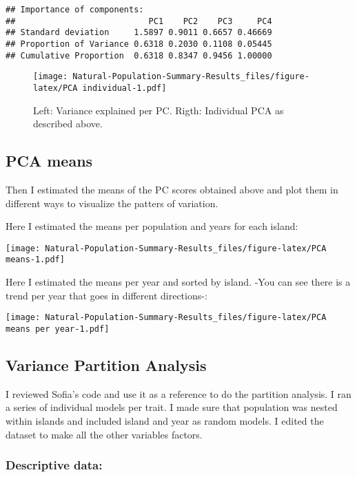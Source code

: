 \documentclass[
]{article}
\begin{document}
\begin{verbatim}
## Importance of components:
##                           PC1    PC2    PC3     PC4
## Standard deviation     1.5897 0.9011 0.6657 0.46669
## Proportion of Variance 0.6318 0.2030 0.1108 0.05445
## Cumulative Proportion  0.6318 0.8347 0.9456 1.00000
\end{verbatim}

\begin{figure}
\centering
\texttt{[image: Natural-Population-Summary-Results\_files/figure-latex/PCA individual-1.pdf]}
\caption{Left: Variance explained per PC. Rigth: Individual PCA as
described above.}
\end{figure}

\hypertarget{pca-means}{%
\subsection{PCA means}\label{pca-means}}

Then I estimated the means of the PC scores obtained above and plot them
in different ways to visualize the patters of variation.

Here I estimated the means per population and years for each island:

\texttt{[image: Natural-Population-Summary-Results\_files/figure-latex/PCA means-1.pdf]}

Here I estimated the means per year and sorted by island. -You can see
there is a trend per year that goes in different directions-:

\texttt{[image: Natural-Population-Summary-Results\_files/figure-latex/PCA means per year-1.pdf]}

\hypertarget{variance-partition-analysis}{%
\subsection{Variance Partition
Analysis}\label{variance-partition-analysis}}

I reviewed Sofia's code and use it as a reference to do the partition
analysis. I ran a series of individual models per trait. I made sure
that population was nested within islands and included island and year
as random models. I edited the dataset to make all the other variables
factors.

\hypertarget{descriptive-data}{%
\subsubsection{Descriptive data:}\label{descriptive-data}}
\end{document}

